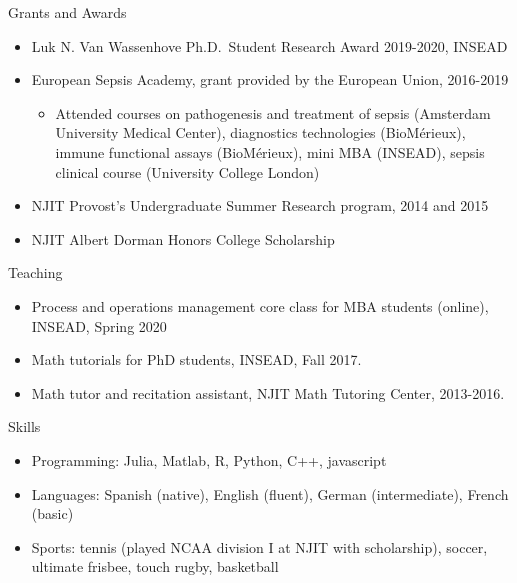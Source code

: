 \documentclass{resume}
\begin{document}
\begin{rSection}{Grants and Awards}

\begin{itemize}
\item Luk N. Van Wassenhove Ph.D.\ Student Research Award 2019-2020, INSEAD
\item European Sepsis Academy, grant provided by the European Union, 2016-2019
\begin{itemize}
  \item Attended courses on pathogenesis and treatment of sepsis (Amsterdam University Medical Center), diagnostics technologies (BioM\'erieux), immune functional assays (BioM\'erieux), mini MBA (INSEAD), sepsis clinical course (University College London)
\end{itemize}
\item NJIT Provost’s Undergraduate Summer Research program, 2014 and 2015
\item NJIT Albert Dorman Honors College Scholarship
\end{itemize}

\begin{rSection}{Teaching}
\begin{itemize}
\item Process and operations management core class for MBA students (online), INSEAD, Spring 2020
\item Math tutorials for PhD students, INSEAD, Fall 2017.
\item Math tutor and recitation assistant, NJIT Math Tutoring Center, 2013-2016.
\end{itemize}

\end{rSection}


\end{rSection}

\begin{rSection}{Skills}
\begin{itemize}
\item Programming: Julia, Matlab, R, Python, C++, javascript
\item Languages: Spanish (native), English (fluent), German (intermediate), French (basic)
\item Sports: tennis (played NCAA division I at NJIT with scholarship), soccer, ultimate frisbee, touch rugby, basketball
\end{itemize}

\end{rSection}
 
\end{document}
